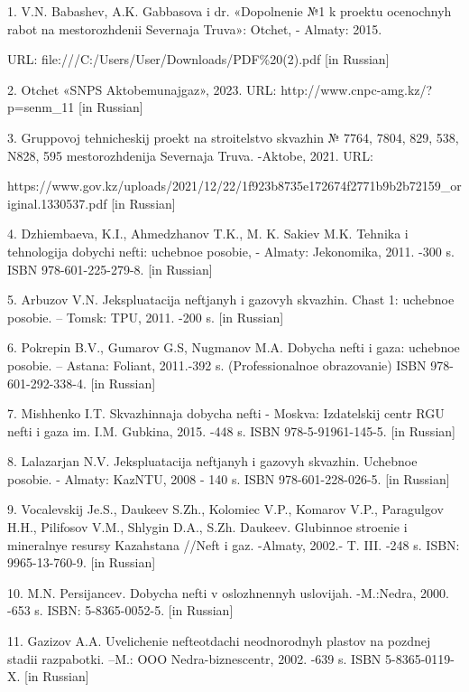 1. V.N. Babashev, A.K. Gabbasova i dr. «Dopolnenie №1 k proektu
ocenochnyh rabot na mestorozhdenii Severnaja Truva»: Otchet, - Almaty:
2015.

URL: file:///C:/Users/User/Downloads/PDF\%20(2).pdf {[}in Russian{]}

2. Otchet «SNPS Aktobemunajgaz», 2023. URL:
http://www.cnpc-amg.kz/?p=senm\_11 {[}in Russian{]}

3. Gruppovoj tehnicheskij proekt na stroitel\textquotesingle stvo
skvazhin № 7764, 7804, 829, 538, N828, 595 mestorozhdenija Severnaja
Truva. -Aktobe, 2021. URL:

https://www.gov.kz/uploads/2021/12/22/1f923b8735e172674f2771b9b2b72159\_original.1330537.pdf
{[}in Russian{]}

4. Dzhiembaeva, K.I., Ahmedzhanov T.K., M. K. Sakiev M.K. Tehnika i
tehnologija dobychi nefti: uchebnoe posobie, - Almaty: Jekonomika, 2011.
-300 s. ISBN 978-601-225-279-8. {[}in Russian{]}

5. Arbuzov V.N. Jekspluatacija neftjanyh i gazovyh skvazhin.
Chast\textquotesingle{} 1: uchebnoe posobie. -- Tomsk: TPU, 2011. -200
s. {[}in Russian{]}

6. Pokrepin B.V., Gumarov G.S, Nugmanov M.A. Dobycha nefti i gaza:
uchebnoe posobie. -- Astana: Foliant, 2011.-392 s.
(Professional\textquotesingle noe obrazovanie) ISBN 978-601-292-338-4.
{[}in Russian{]}

7. Mishhenko I.T. Skvazhinnaja dobycha nefti - Moskva:
Izdatel\textquotesingle skij centr RGU nefti i gaza im. I.M. Gubkina,
2015. -448 s. ISBN 978-5-91961-145-5. {[}in Russian{]}

8. Lalazarjan N.V. Jekspluatacija neftjanyh i gazovyh skvazhin. Uchebnoe
posobie. - Almaty: KazNTU, 2008 - 140 s. ISBN 978-601-228-026-5. {[}in
Russian{]}

9. Vocalevskij Je.S., Daukeev S.Zh., Kolomiec V.P., Komarov V.P.,
Paragul\textquotesingle gov H.H., Pilifosov V.M., Shlygin D.A., S.Zh.
Daukeev. Glubinnoe stroenie i mineral\textquotesingle nye resursy
Kazahstana //Neft\textquotesingle{} i gaz. -Almaty, 2002.- T. III. -248
s. ISBN: 9965-13-760-9. {[}in Russian{]}

10. M.N. Persijancev. Dobycha nefti v oslozhnennyh uslovijah. -M.:Nedra,
2000. -653 s. ISBN: 5-8365-0052-5. {[}in Russian{]}

11. Gazizov A.A. Uvelichenie nefteotdachi neodnorodnyh plastov na
pozdnej stadii razpabotki. --M.: OOO Nedra-biznescentr, 2002. -639 s.
ISBN 5-8365-0119-X. {[}in Russian{]}


